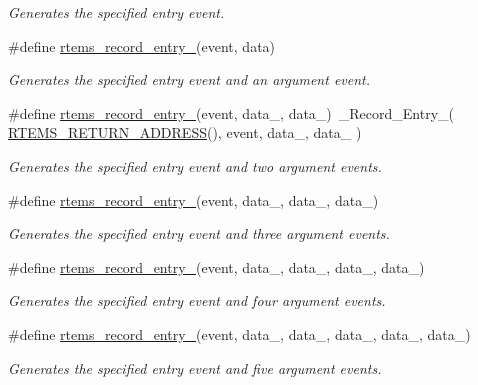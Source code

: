 \begin{DoxyCompactItemize}
\begin{DoxyCompactList}\small\item\em Generates the specified entry event. \end{DoxyCompactList}\item 
\#define \mbox{\hyperlink{group__RTEMSRecord_ga9344d5b82305235c0616959f1cb147c6}{rtems\+\_\+record\+\_\+entry\+\_}}(event,  data)
\begin{DoxyCompactList}\small\item\em Generates the specified entry event and an argument event. \end{DoxyCompactList}\item 
\#define \mbox{\hyperlink{group__RTEMSRecord_ga3a054939305c9be661000b15cd8276f3}{rtems\+\_\+record\+\_\+entry\+\_}}(event,  data\+\_,  data\+\_)~\+\_\+\+Record\+\_\+\+Entry\+\_( \mbox{\hyperlink{group__RTEMSScoreBaseDefs_ga70a1b8869a1ec49d30613af22ebc3f50}{R\+T\+E\+M\+S\+\_\+\+R\+E\+T\+U\+R\+N\+\_\+\+A\+D\+D\+R\+E\+SS}}(), event, data\+\_, data\+\_ )
\begin{DoxyCompactList}\small\item\em Generates the specified entry event and two argument events. \end{DoxyCompactList}\item 
\#define \mbox{\hyperlink{group__RTEMSRecord_ga3615dd0047f5df74e780a4976bd3ae8c}{rtems\+\_\+record\+\_\+entry\+\_}}(event,  data\+\_,  data\+\_,  data\+\_)
\begin{DoxyCompactList}\small\item\em Generates the specified entry event and three argument events. \end{DoxyCompactList}\item 
\#define \mbox{\hyperlink{group__RTEMSRecord_gad0d6292d297aebd18e28b05b6920d38b}{rtems\+\_\+record\+\_\+entry\+\_}}(event,  data\+\_,  data\+\_,  data\+\_,  data\+\_)
\begin{DoxyCompactList}\small\item\em Generates the specified entry event and four argument events. \end{DoxyCompactList}\item 
\#define \mbox{\hyperlink{group__RTEMSRecord_ga9692d27609198e2bf1b8b5d4887846ae}{rtems\+\_\+record\+\_\+entry\+\_}}(event,  data\+\_,  data\+\_,  data\+\_,  data\+\_,  data\+\_)
\begin{DoxyCompactList}\small\item\em Generates the specified entry event and five argument events. \end{DoxyCompactList}\item 

\end{DoxyCompactItemize}
